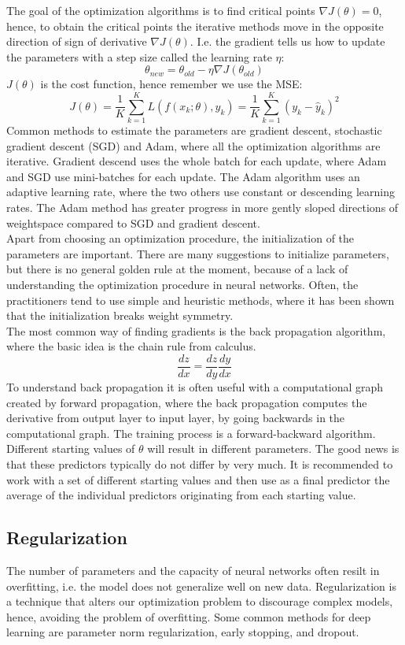 The goal of the optimization algorithms is to find critical points $\nabla J(\theta)=0$, hence, to obtain the critical points the iterative methods move in the opposite direction of sign of derivative $\nabla J(\theta)$. I.e. the gradient tells us how to update the parameters with a step size called the learning rate $\eta$:
$$\theta_{new}=\theta_{old} - \eta \nabla J(\theta_{old}) $$
$J(\theta)$ is the cost function, hence remember we use the MSE:
$$J(\theta)= \frac{1}{K}\sum_{k=1}^{K} L(f(x_k;\theta),y_k)=\frac{1}{K}\sum_{k=1}^{K} (y_k-\hat{y}_k)^2$$
Common methods to estimate the parameters are gradient descent, stochastic gradient descent (SGD) and Adam, where all the optimization algorithms are iterative. Gradient descend uses the whole batch for each update, where Adam and SGD use mini-batches for each update. The Adam algorithm uses an adaptive learning rate, where the two others use constant or descending learning rates. The Adam method has greater progress in more gently sloped directions of weightspace compared to SGD and gradient descent. \\

Apart from choosing an optimization procedure, the initialization of the parameters are important. There are many suggestions to initialize parameters, but there is no general golden rule at the moment, because of a lack of understanding the optimization procedure in neural networks. Often, the practitioners tend to use simple and heuristic methods, where it has been shown that the initialization breaks weight symmetry.\\

The most common way of finding gradients is the back propagation algorithm, where the basic idea is the chain rule from calculus.
$$\frac{dz}{dx}= \frac{dz}{dy} \frac{dy}{dx}$$
To understand back propagation it is often useful with a computational graph created by forward propagation, where the back propagation computes the derivative from output layer to input layer, by going backwards in the computational graph. The training process is a forward-backward algorithm. Different starting values of $\theta$ will result in different parameters. The good news is that these predictors typically do not differ by very much. It is recommended to work with a set of different starting values and then use as a final predictor the average of the individual predictors originating from each starting value.

\subsection{Regularization}\label{regularization}
The number of parameters and the capacity of neural networks often resilt in overfitting, i.e. the model does not generalize well on new data. Regularization is a technique that alters our optimization problem to discourage complex models, hence, avoiding the problem of overfitting. Some common methods for deep learning are parameter norm regularization, early stopping, and dropout.\\

